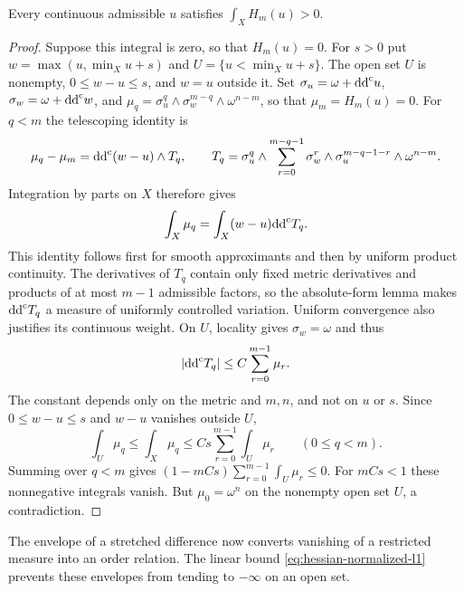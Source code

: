 \begin{lemma}\label{hessian:hessian-nonvanishing}
Every continuous admissible $u$ satisfies $\int_X H_m(u)>0$.
\end{lemma}
\begin{proof}
Suppose this integral is zero, so that $H_m(u)=0$. For $s>0$ put
$w=\max(u,\min_Xu+s)$ and $U=\{u<\min_Xu+s\}$.
The open set $U$ is nonempty, $0\leq w-u\leq s$, and $w=u$ outside it.
Set $\sigma_u=\omega+\mathrm{dd}^{\mathrm{c}} u$, $\sigma_w=\omega+\mathrm{dd}^{\mathrm{c}} w$, and
$\mu_q=\sigma_u^q\wedge\sigma_w^{m-q}\wedge\omega^{n-m}$, so that
$\mu_m=H_m(u)=0$. For $q<m$ the telescoping identity is
\[
 \mu_q-\mu_m=\mathrm{dd}^{\mathrm{c}}(w-u)\wedge T_q,\qquad
 T_q=\sigma_u^q\wedge
       \sum_{r=0}^{m-q-1}\sigma_w^r\wedge\sigma_u^{m-q-1-r}
                                      \wedge\omega^{n-m}.
\]
Integration by parts on $X$ therefore gives
\[
 \int_X\mu_q=\int_X(w-u)\mathrm{dd}^{\mathrm{c}} T_q.
\]
This identity follows first for smooth approximants and then by uniform
product continuity. The derivatives of $T_q$ contain only fixed metric
derivatives and products of at most $m-1$ admissible factors, so the
absolute-form lemma makes $\mathrm{dd}^{\mathrm{c}} T_q$ a measure of uniformly controlled
variation. Uniform convergence also justifies its continuous weight.
On $U$, locality gives $\sigma_w=\omega$ and thus
\[
 |\mathrm{dd}^{\mathrm{c}} T_q|\leq C\sum_{r=0}^{m-1}\mu_r.
\]
The constant depends only on the metric and $m,n$, and not on $u$ or $s$.
Since $0\leq w-u\leq s$ and $w-u$ vanishes outside $U$,
\[
 \int_U\mu_q\leq\int_X\mu_q\leq Cs\sum_{r=0}^{m-1}\int_U\mu_r
 \qquad(0\leq q<m).
\]
Summing over $q<m$ gives
$(1-mCs)\sum_{r=0}^{m-1}\int_U\mu_r\leq0$. For $mCs<1$ these
nonnegative integrals vanish. But $\mu_0=\omega^n$ on the nonempty
open set $U$, a contradiction.
\end{proof}

The envelope of a stretched difference now converts vanishing of a
restricted measure into an order relation. The linear bound
\eqref{eq:hessian-normalized-l1} prevents these envelopes from tending to
$-\infty$ on an open set.


